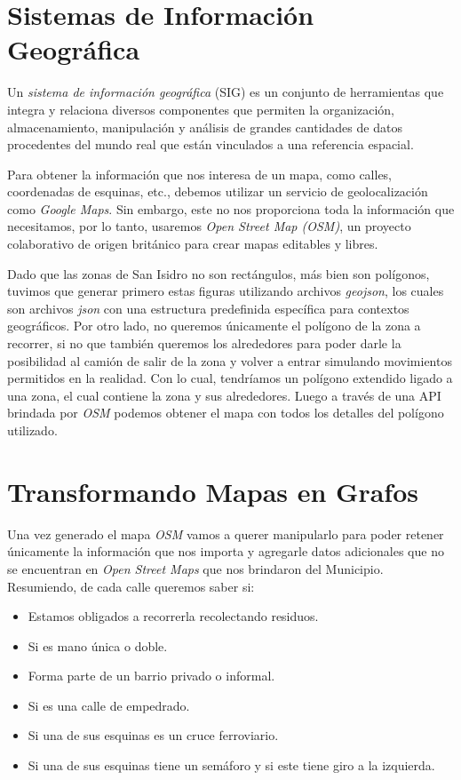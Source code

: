 \section{Sistemas de Información Geográfica}

Un \textit{sistema de información geográfica} (SIG) es un conjunto de herramientas que integra y relaciona diversos componentes que permiten la organización, almacenamiento, manipulación y análisis de grandes cantidades de datos procedentes del mundo real que están vinculados a una referencia espacial.

\vspace{3mm}

Para obtener la información que nos interesa de un mapa, como calles, coordenadas de esquinas, etc., debemos utilizar un servicio de geolocalización como \textit{Google Maps}. Sin embargo, este no nos proporciona toda la información que necesitamos, por lo tanto, usaremos \textit{Open Street Map (OSM)}, un proyecto colaborativo de origen británico para crear mapas editables y libres.

\vspace{3mm}

Dado que las zonas de San Isidro no son rectángulos, más bien son polígonos, tuvimos que generar primero estas figuras utilizando archivos \textit{geojson}, los cuales son archivos \textit{json} con una estructura predefinida específica para contextos geográficos. Por otro lado, no queremos únicamente el polígono de la zona a recorrer, si no que también queremos los alrededores para poder darle la posibilidad al camión de salir de la zona y volver a entrar simulando movimientos permitidos en la realidad. Con lo cual, tendríamos un polígono extendido ligado a una zona, el cual contiene la zona y sus alrededores. Luego a través de una API brindada por \textit{OSM} podemos obtener el mapa con todos los detalles del polígono utilizado.

\section{Transformando Mapas en Grafos}

Una vez generado el mapa \textit{OSM} vamos a querer manipularlo para poder retener únicamente la información que nos importa y agregarle datos adicionales que no se encuentran en \textit{Open Street Maps} que nos brindaron del Municipio. Resumiendo, de cada calle queremos saber si:
\begin{itemize}
    \item Estamos obligados a recorrerla recolectando residuos.
    \item Si es mano única o doble.
    \item Forma parte de un barrio privado o informal.
    \item Si es una calle de empedrado.
    \item Si una de sus esquinas es un cruce ferroviario.
    \item Si una de sus esquinas tiene un semáforo y si este tiene giro a la izquierda.
\end{itemize}

